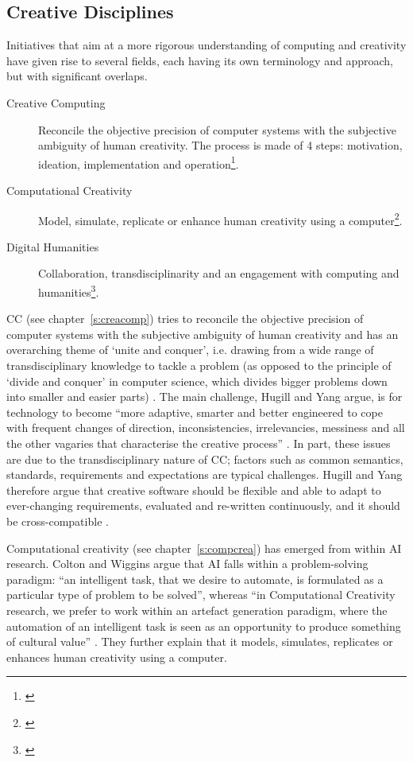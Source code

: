 \subsection{Creative Disciplines}

Initiatives that aim at a more rigorous understanding of computing and creativity have given rise to several fields, each having its own terminology and approach, but with significant overlaps.

\begin{description}
  \item [Creative Computing] Reconcile the objective precision of computer systems with the subjective ambiguity of human creativity. The process is made of 4 steps: motivation, ideation, implementation and operation\footnote{\autocite{Hugill2013c}}.
  \item [Computational Creativity] Model, simulate, replicate or enhance human creativity using a computer\footnote{\autocite{Colton2012}}.
  \item [Digital Humanities] Collaboration, transdisciplinarity and an engagement with computing and humanities\footnote{\autocite{Burdick2012}}.
\end{description}

\acf{CC} (see chapter~\ref{s:creacomp}) tries to reconcile the objective precision of computer systems with the subjective ambiguity of human creativity \autocite{Hugill2013c} and has an overarching theme of `unite and conquer', i.e. drawing from a wide range of transdisciplinary knowledge to tackle a problem (as opposed to the principle of `divide and conquer' in computer science, which divides bigger problems down into smaller and easier parts) \autocite{Yang2013}. The main challenge, Hugill and Yang argue, is for technology to become ``more adaptive, smarter and better engineered to cope with frequent changes of direction, inconsistencies, irrelevancies, messiness and all the other vagaries that characterise the creative process'' \autocite*{Hugill2013c}. In part, these issues are due to the transdisciplinary nature of \ac{CC}; factors such as common semantics, standards, requirements and expectations are typical challenges. Hugill and Yang therefore argue that creative software should be flexible and able to adapt to ever-changing requirements, evaluated and re-written continuously, and it should be cross-compatible \autocite*{Hugill2013c}.

Computational creativity (see chapter~\ref{s:compcrea}) has emerged from within \ac{AI} research. Colton and Wiggins argue that \ac{AI} falls within a problem-solving paradigm: ``an intelligent task, that we desire to automate, is formulated as a particular type of problem to be solved'', whereas ``in Computational Creativity research, we prefer to work within an artefact generation paradigm, where the automation of an intelligent task is seen as an opportunity to produce something of cultural value'' \autocite*{Colton2012}. They further explain that it models, simulates, replicates or enhances human creativity using a computer.

